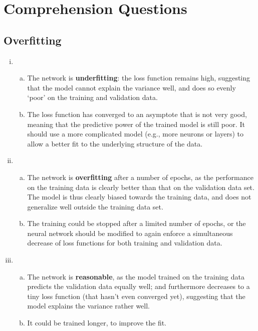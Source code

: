 \documentclass{article}
\begin{document}
\section{Comprehension Questions}
\subsection{Overfitting}
\begin{enumerate}[(i)]
    \item \begin{enumerate}[(a)]
        \item The network is \textbf{underfitting}: the loss function remains high, suggesting that the model cannot explain the variance well, and does so evenly `poor' on the training and validation data.
        \item The loss function has converged to an asymptote that is not very good, meaning that the predictive power of the trained model is still poor. It should use  a more complicated model (e.g., more neurons or layers) to allow a better fit to the underlying structure of the data.
    \end{enumerate} 
    \item \begin{enumerate}[(a)]
        \item The network is \textbf{overfitting} after a number of epochs, as the performance on the training data is clearly better than that on the validation data set. The model is thus clearly biased towards the training data, and does not generalize well outside the training data set.
        \item The training could be stopped after a limited number of epochs, or the neural network should be modified to again enforce a simultaneous decrease of loss functions for both training and validation data.
    \end{enumerate}
    \item \begin{enumerate}[(a)]
        \item The network is \textbf{reasonable}, as the model trained on the training data predicts the validation data equally well; and furthermore decreases to a tiny loss function (that hasn't even converged yet), suggesting that the model explains the variance rather well.
        \item It could be trained longer, to improve the fit.
    \end{enumerate}
\end{enumerate}
\end{document}
